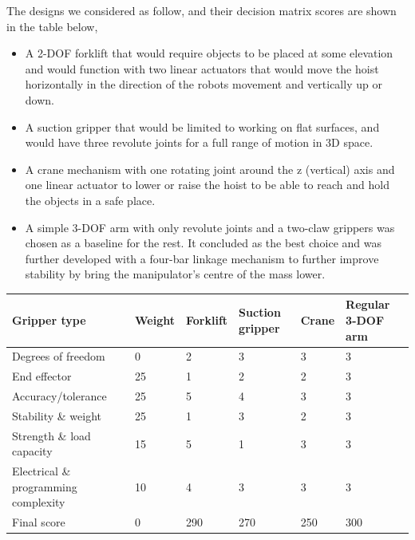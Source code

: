 \documentclass{article}
\begin{document}
The designs we considered as follow, and their decision matrix scores are shown in the table below,

\begin{itemize}

\item A 2-DOF forklift that would require objects to be placed at some elevation and would function with two linear actuators that would move the hoist horizontally in the direction of the robots movement and vertically up or down.

\item A suction gripper that would be limited to working on flat surfaces, and would have three revolute joints for a full range of motion in 3D space.

\item A crane mechanism with one rotating joint around the z (vertical) axis and one linear actuator to lower or raise the hoist to be able to reach and hold the objects in a safe place.

\item A simple 3-DOF arm with only revolute joints and a two-claw grippers was chosen as a baseline for the rest. It concluded as the best choice and was further developed with a four-bar linkage mechanism to further improve stability by bring the manipulator's centre of the mass lower.

\end{itemize}

\begin{table}[H]
  \centering
  \begin{tabular}{|m{12em}|l|l|m{5em}|l|m{5em}|}
  \hline
      \textbf{Gripper type} & \textbf{Weight} & \textbf{Forklift} & \textbf{Suction gripper} & \textbf{Crane} & \textbf{Regular 3-DOF arm} \\ \hline
      Degrees of freedom & 0 & 2 & 3 & 3 & 3 \\ \hline
      End effector & 25 & 1 & 2 & 2 & 3 \\ \hline
      Accuracy/tolerance & 25 & 5 & 4 & 3 & 3 \\ \hline
      Stability \& weight & 25 & 1 & 3 & 2 & 3 \\ \hline
      Strength \& load capacity & 15 & 5 & 1 & 3 & 3 \\ \hline
      Electrical \& programming complexity & 10 & 4 & 3 & 3 & 3 \\ \hline
      Final score & 0 & 290 & 270 & 250 & 300 \\ \hline
  \end{tabular}
\end{table}
\end{document}
